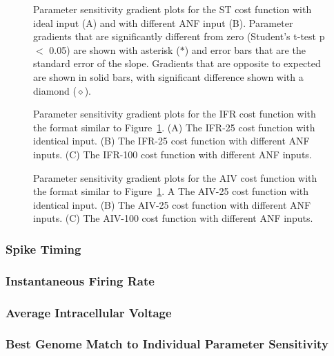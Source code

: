 \begin{figure}[htb]
  \centering
  \caption{Parameter sensitivity gradient plots for the ST cost
    function with ideal input (A) and with different ANF input
    (B). Parameter gradients that are significantly different from
    zero (Student's t-test p $<$ 0.05) are shown with asterisk
    ($\ast$) and error bars that are the standard error of the
    slope. Gradients that are opposite to expected are shown in
    solid bars, with significant difference shown with a diamond
    ($\diamond$).}
  \label{fig:13}
\end{figure}



\begin{figure}[htb]
  \centering
  \caption{Parameter sensitivity gradient plots for the IFR cost
    function with the format similar to Figure~\ref{fig:13}. (A) The
    IFR-25 cost function with identical input. (B) The IFR-25 cost
    function with different ANF inputs. (C) The IFR-100 cost
    function with different ANF inputs.}
  \label{fig:14}
\end{figure}



\begin{figure}[htb]
  \centering
  \caption{Parameter sensitivity gradient plots for the AIV cost
    function with the format similar to Figure~\ref{fig:13}. A The
    AIV-25 cost function with identical input. (B) The AIV-25 cost
    function with different ANF inputs. (C) The AIV-100 cost
    function with different ANF inputs.}
  \label{fig:15}
\end{figure}




\subsubsection{Spike Timing}

\subsubsection{Instantaneous Firing Rate}

\subsubsection{Average Intracellular Voltage}


\subsubsection{Best Genome Match to Individual Parameter Sensitivity}

